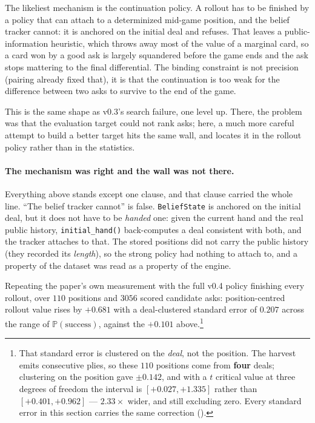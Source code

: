 \documentclass[11pt,letterpaper]{article}
\newcommand{\Prob}{\ensuremath{\mathbb{P}}}
\begin{document}
The likeliest mechanism is the continuation policy. A rollout has to be finished
by a policy that can attach to a determinized mid-game position, and the
belief tracker cannot: it is anchored on the initial deal and refuses. That
leaves a public-information heuristic, which throws away most of the value of a
marginal card, so a card won by a good ask is largely squandered before the game
ends and the ask stops mattering to the final differential. The binding
constraint is not precision (pairing already fixed that), it is that the
continuation is too weak for the difference between two asks to survive to the
end of the game.

This is the same shape as v0.3's search failure, one level up. There, the
problem was that the evaluation target could not rank asks; here, a much more
careful attempt to build a better target hits the same wall, and locates it in
the rollout policy rather than in the statistics.

\paragraph{The mechanism was right and the wall was not there.} Everything above
stands except one clause, and that clause carried the whole line. ``The belief
tracker cannot'' is false. \texttt{BeliefState} is anchored on the initial deal,
but it does not have to be \emph{handed} one: given the current hand and the
real public history, \texttt{initial\_hand()} back-computes a deal consistent
with both, and the tracker attaches to that. The stored positions did not carry
the public history (they recorded its \emph{length}), so the strong policy
had nothing to attach to, and a property of the dataset was read as a property
of the engine.

Repeating the paper's own measurement with the full v0.4 policy finishing every
rollout, over $110$ positions and $3056$ scored candidate asks: position-centred
rollout value rises by $+0.681$ with a deal-clustered standard error of
$0.207$ across the range of
$\Prob(\text{success})$, against the $+0.101$ above.\footnote{That standard
error is clustered on the \emph{deal}, not the position. The harvest emits
consecutive plies, so these $110$ positions come from \textbf{four} deals;
clustering on the position gave $\pm 0.142$, and with a $t$ critical value at
three degrees of freedom the interval is $[+0.027, +1.335]$ rather than
$[+0.401, +0.962]$ --- $2.33\times$ wider, and still excluding zero. Every
standard error in this section carries the same correction
().}
\end{document}
